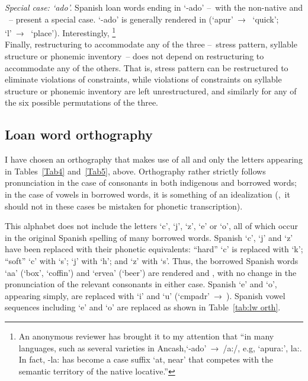 {\noindent
\textit{Special case: ‘ado’.} Spanish loan words ending in ‘-ado’ --~with the non-native  and ~-- present a special case. ‘-ado’ is generally rendered \textipa{[aw]} in \SYQ{} (‘apur’~→~ ‘quick’; ‘l’~→~ ‘place’). Interestingly, \footnote{An anonymous reviewer has brought it to my attention that “in many \QI{} languages, such as several varieties in Ancash,‘-ado’~→~/a:/, e.g, ‘apura:’, la:. In fact, -la: has become a case suffix ‘at, near’ that competes with the semantic territory of the native locative.”}\\

Finally, restructuring to accommodate any of the three --~stress pattern, syllable structure or phonemic inventory~-- does not depend on restructuring to accommodate any of the others. That is, stress pattern can be restructured to eliminate violations of \SYQ{} constraints, while violations of constraints on syllable structure or phonemic inventory are left unrestructured, and similarly for any of the six possible permutations of the three.

\subsection{Loan word orthography}
I have chosen an orthography that makes use of all and only the letters appearing in Tables~\ref{Tab4} and~\ref{Tab5}, above. Orthography rather strictly follows pronunciation in the case of consonants in both indigenous and borrowed words; in the case of vowels in borrowed words, it is something of an idealization (\ie,~it should not in these cases be mistaken for phonetic transcription). 

This alphabet does not include the letters ‘c’, ‘j’, ‘z’, ‘e’ or ‘o’, all of which occur in the original Spanish spelling of many borrowed words. Spanish ‘c’, ‘j’ and ‘z’ have been replaced with their \SYQ{} phonetic equivalents: “hard” ‘c’ is replaced with ‘k’; “soft” ‘c’ with ‘s’; ‘j’ with ‘h’; and ‘z’ with ‘s’. Thus, the borrowed Spanish words ‘aa’ (‘box’, ‘coffin’) and ‘ervea’ (‘beer’) are rendered  and , with no change in the pronunciation of the relevant consonants in either case. Spanish ‘e’ and ‘o’, appearing simply, are replaced with ‘i’ and ‘u’ (‘cmpadr’~→~). Spanish vowel sequences including ‘e’ and ‘o’ are replaced as shown in Table~\ref{tab:lw orth}.

}
